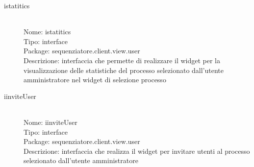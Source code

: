 \begin{description}
	\item[istatitics] 
  	\hfill \\
  	Nome: istatitics\\
  	Tipo: interface\\
	Package: sequenziatore.client.view.user\\
	Descrizione: interfaccia che permette di realizzare il widget per la visualizzazione delle statistiche del processo selezionato dall'utente amministratore nel widget di selezione processo
\end{description}
\begin{description}
	\item[iinviteUser] 
  	\hfill \\
  	Nome: iinviteUser\\
  	Tipo: interface\\
	Package: sequenziatore.client.view.user\\
	Descrizione: interfaccia che realizza il widget per invitare utenti al processo selezionato dall'utente amministratore
\end{description}